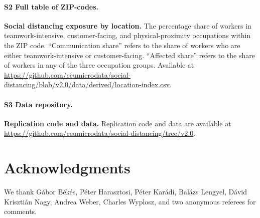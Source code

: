 \paragraph*{S2 Full table of ZIP-codes.}
\label{S2_File}
{\bf Social distancing exposure by location.} The percentage share of workers in teamwork-intensive, customer-facing, and physical-proximity occupations within the ZIP code. ``Communication share'' refers to the share of workers who are either teamwork-intensive or customer-facing. ``Affected share'' refers to the share of workers in any of the three occupation groups. Available at \url{https://github.com/ceumicrodata/social-distancing/blob/v2.0/data/derived/location-index.csv}.

\paragraph*{S3 Data repository.}
\label{S3_URL}
{\bf Replication code and data.} Replication code and data are available at \url{https://github.com/ceumicrodata/social-distancing/tree/v2.0}.

\section*{Acknowledgments}
We thank Gábor Békés, Péter Harasztosi, Péter Karádi, Balázs Lengyel, Dávid Krisztián Nagy, Andrea Weber, Charles Wyplosz, and two anonymous referees for comments.

\nolinenumbers



